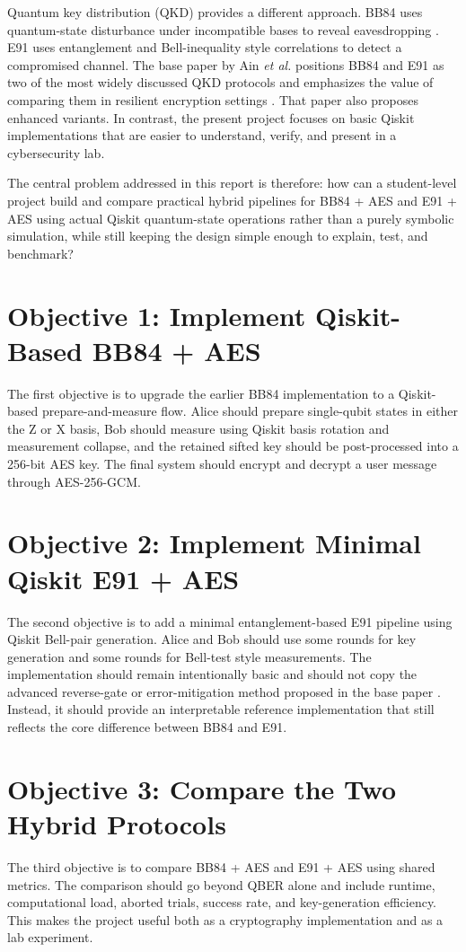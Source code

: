 \documentclass[conference]{IEEEtran}
\begin{document}
Quantum key distribution (QKD) provides a different approach. BB84 uses quantum-state disturbance under incompatible bases to reveal eavesdropping \cite{bennett1984bb84}. E91 uses entanglement and Bell-inequality style correlations to detect a compromised channel. The base paper by Ain \emph{et al.} positions BB84 and E91 as two of the most widely discussed QKD protocols and emphasizes the value of comparing them in resilient encryption settings \cite{ain2025novel}. That paper also proposes enhanced variants. In contrast, the present project focuses on basic Qiskit implementations that are easier to understand, verify, and present in a cybersecurity lab.

The central problem addressed in this report is therefore: how can a student-level project build and compare practical hybrid pipelines for BB84 + AES and E91 + AES using actual Qiskit quantum-state operations rather than a purely symbolic simulation, while still keeping the design simple enough to explain, test, and benchmark?

\section{Objective 1: Implement Qiskit-Based BB84 + AES}
The first objective is to upgrade the earlier BB84 implementation to a Qiskit-based prepare-and-measure flow. Alice should prepare single-qubit states in either the Z or X basis, Bob should measure using Qiskit basis rotation and measurement collapse, and the retained sifted key should be post-processed into a 256-bit AES key. The final system should encrypt and decrypt a user message through AES-256-GCM.

\section{Objective 2: Implement Minimal Qiskit E91 + AES}
The second objective is to add a minimal entanglement-based E91 pipeline using Qiskit Bell-pair generation. Alice and Bob should use some rounds for key generation and some rounds for Bell-test style measurements. The implementation should remain intentionally basic and should not copy the advanced reverse-gate or error-mitigation method proposed in the base paper \cite{ain2025novel}. Instead, it should provide an interpretable reference implementation that still reflects the core difference between BB84 and E91.

\section{Objective 3: Compare the Two Hybrid Protocols}
The third objective is to compare BB84 + AES and E91 + AES using shared metrics. The comparison should go beyond QBER alone and include runtime, computational load, aborted trials, success rate, and key-generation efficiency. This makes the project useful both as a cryptography implementation and as a lab experiment.
\end{document}
